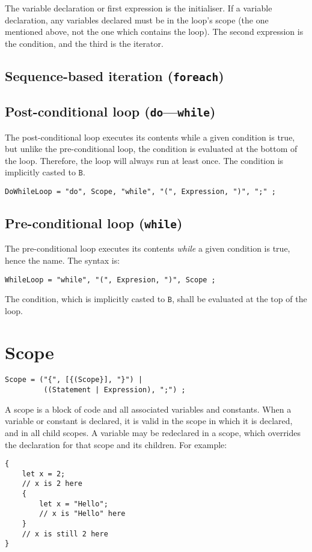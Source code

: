 \documentclass{article}
\newcommand{\R}[1]{\mathtt{#1}}
\begin{document}
The variable declaration or first expression is the initialiser. If a variable
declaration, any variables declared must be in the loop's scope (the one
mentioned above, not the one which contains the loop). The second expression
is the condition, and the third is the iterator.

\subsection{Sequence-based iteration (\texttt{foreach})}
\label{sub:statements:foreach}

\subsection{Post-conditional loop (\texttt{do}---\texttt{while})}
\label{sub:statements:do}
The post-conditional loop executes its contents while a given condition is
true, but unlike the pre-conditional loop, the condition is evaluated at the
bottom of the loop. Therefore, the loop will always run at least once. The
condition is implicitly casted to $\R{B}$.

\begin{verbatim}
DoWhileLoop = "do", Scope, "while", "(", Expression, ")", ";" ;
\end{verbatim}

\subsection{Pre-conditional loop (\texttt{while})}
\label{sub:statements:while}
The pre-conditional loop executes its contents \emph{while} a given condition
is true, hence the name. The syntax is:

\begin{verbatim}
WhileLoop = "while", "(", Expresion, ")", Scope ;
\end{verbatim}

The condition, which is implicitly casted to $\R{B}$, shall be evaluated at the
top of the loop.

\section{Scope}
\label{sec:scope}
\begin{verbatim}
Scope = ("{", [{(Scope}], "}") |
         ((Statement | Expression), ";") ;
\end{verbatim}
A scope is a block of code and all associated variables and constants. When a
variable or constant is declared, it is valid in the scope in which it is declared,
and in all child scopes. A variable may be redeclared in a scope, which overrides
the declaration for that scope and its children. For example:
\begin{verbatim}
{
    let x = 2;
    // x is 2 here
    {
        let x = "Hello";
        // x is "Hello" here
    }
    // x is still 2 here
}
\end{verbatim}
\end{document}
